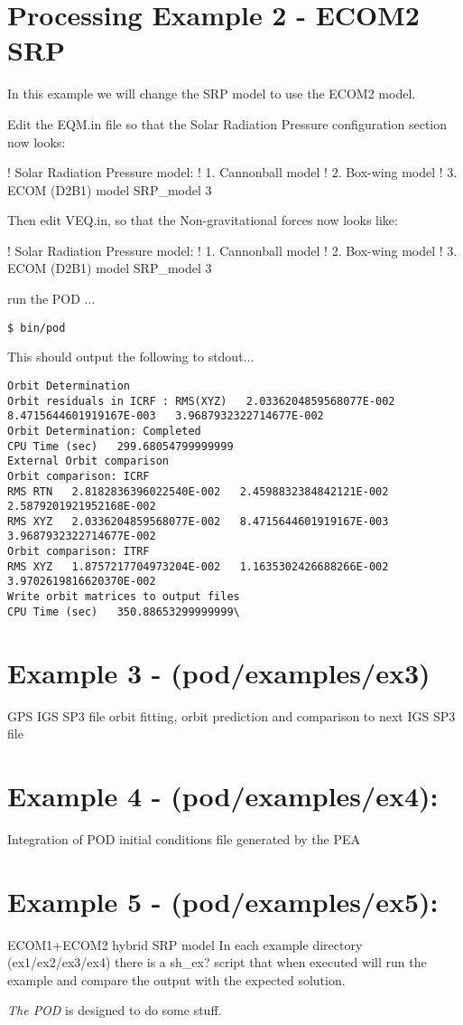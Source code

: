 \section{Processing Example 2 - ECOM2 SRP}
In this example we will change the SRP model to use the ECOM2 model.

Edit the EQM.in file so that the Solar Radiation Pressure configuration section now looks:

! Solar Radiation Pressure model: ! 1. Cannonball model ! 2. Box-wing model ! 3. ECOM (D2B1) model SRP\_model 3

Then edit VEQ.in, so that the Non-gravitational forces now looks like:


! Solar Radiation Pressure model: ! 1. Cannonball model ! 2. Box-wing model ! 3. ECOM (D2B1) model SRP\_model 3

run the POD ...

\begin{lstlisting}
$ bin/pod
\end{lstlisting}
This should output the following to stdout...
\begin{lstlisting}
Orbit Determination
Orbit residuals in ICRF : RMS(XYZ)   2.0336204859568077E-002   8.4715644601919167E-003   3.9687932322714677E-002
Orbit Determination: Completed
CPU Time (sec)   299.68054799999999
External Orbit comparison
Orbit comparison: ICRF
RMS RTN   2.8182836396022540E-002   2.4598832384842121E-002   2.5879201921952168E-002
RMS XYZ   2.0336204859568077E-002   8.4715644601919167E-003   3.9687932322714677E-002
Orbit comparison: ITRF
RMS XYZ   1.8757217704973204E-002   1.1635302426688266E-002   3.9702619816620370E-002
Write orbit matrices to output files
CPU Time (sec)   350.88653299999999\
\end{lstlisting}

\section{Example 3 - (pod/examples/ex3)}
GPS IGS SP3 file orbit fitting, orbit prediction and comparison to next IGS SP3 file

\section{Example 4 - (pod/examples/ex4):}
Integration of POD initial conditions file generated by the PEA

\section{Example 5 - (pod/examples/ex5):}
ECOM1+ECOM2 hybrid SRP model
In each example directory (ex1/ex2/ex3/ex4) there is a sh\_ex? script that when executed will run the example and compare the output with the expected solution.

\textit{The POD} is designed to do some stuff.